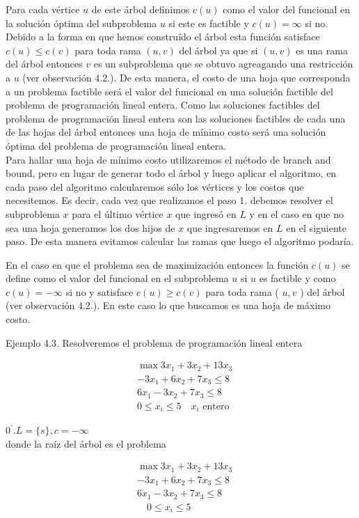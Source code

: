 \documentclass[10pt]{article}
\begin{document}
Para cada vértice $u$ de este árbol definimos $c(u)$ como el valor del funcional en la solución óptima del subproblema $u$ si este es factible y $c(u)=\infty$ si no. Debido a la forma en que hemos construído el árbol esta función satisface $c(u) \leq c(v)$ para toda rama $(u, v)$ del árbol ya que si $(u, v)$ es una rama del árbol entonces $v$ es un subproblema que se obtuvo agreagando una restricción a $u$ (ver observación 4.2.). De esta manera, el costo de una hoja que corresponda a un problema factible será el valor del funcional en una solución factible del problema de programación lineal entera. Como las soluciones factibles del problema de programación lineal entera son las soluciones factibles de cada una de las hojas del árbol entonces una hoja de mínimo costo será una solución óptima del problema de programación lineal entera.\\
Para hallar una hoja de mínimo costo utilizaremos el método de branch and bound, pero en lugar de generar todo el árbol y luego aplicar el algoritmo, en cada paso del algoritmo calcularemos sólo los vértices y los costos que necesitemos. Es decir, cada vez que realizamos el paso 1. debemos resolver el subproblema $x$ para el último vértice $x$ que ingresó en $L$ y en el caso en que no sea una hoja generamos los dos hijos de $x$ que ingresaremos en $L$ en el siguiente paso. De esta manera evitamos calcular las ramas que luego el algoritmo podaría.

En el caso en que el problema sea de maximización entonces la función $c(u)$ se define como el valor del funcional en el subproblema $u$ si $u$ es factible y como $c(u)=-\infty$ si no y satisface $c(u) \geq c(v)$ para toda rama ( $u, v$ ) del árbol (ver observación 4.2.). En este caso lo que buscamos es una hoja de máximo costo.

Ejemplo 4.3. Resolveremos el problema de programación lineal entera

$$
\begin{aligned}
& \max 3 x_{1}+3 x_{2}+13 x_{3} \\
& -3 x_{1}+6 x_{2}+7 x_{3} \leq 8 \\
& 6 x_{1}-3 x_{2}+7 x_{3} \leq 8 \\
& 0 \leq x_{i} \leq 5 \quad x_{i} \text { entero }
\end{aligned}
$$

$0^{\prime} . L=\{s\}, c=-\infty$\\
donde la raíz del árbol es el problema


\begin{align*}
& \max 3 x_{1}+3 x_{2}+13 x_{3} \\
& -3 x_{1}+6 x_{2}+7 x_{3} \leq 8 \\
& 6 x_{1}-3 x_{2}+7 x_{3} \leq 8  \tag{s}\\
& \quad 0 \leq x_{i} \leq 5
\end{align*}
\end{document}

